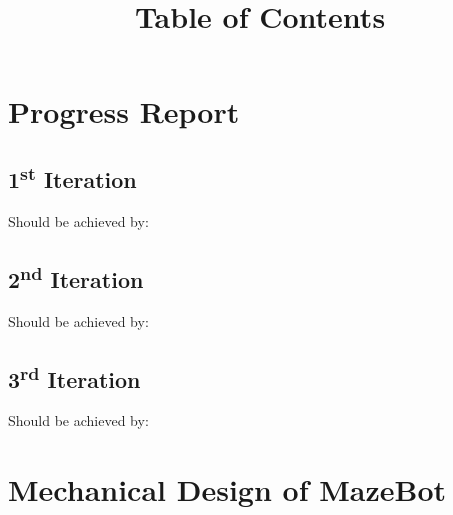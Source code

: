 \documentclass[11pt]{article}
\date{}
\title{Table of Contents}
\newcommand{\ts}{\textsuperscript}
\begin{document}
\maketitle

\tableofcontents

\newpage


\section{Progress Report}
\subsection{1\ts{st} Iteration}

Should be achieved by:
\subsection{2\ts{nd} Iteration}

Should be achieved by:
\subsection{3\ts{rd} Iteration}

Should be achieved by:



\newpage
\section{Mechanical Design of MazeBot}
\end{document}

